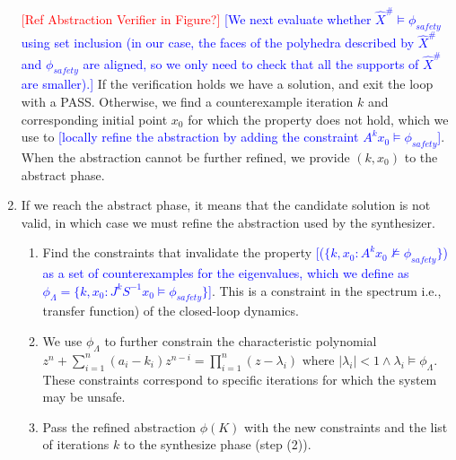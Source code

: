\documentclass[twocolumn]{autart}    %
\newcommand{\mat}[1]{{#1}}
\renewcommand{\vec}[1]{{#1}}
\renewcommand{\note}[1]{\textcolor{red}{[#1]}}
\newcommand{\reply}[1]{\textcolor{blue}{[#1]}}
\begin{document}
\begin{enumerate}
 \note{Ref Abstraction Verifier in Figure?}
\reply{We next evaluate whether $\hat{X}^\# \models \phi_\mathit{safety}$ using set inclusion (in our case, the faces of the polyhedra described by $\hat{X}^\#$ and $\phi_\mathit{safety}$ are aligned, so we only need to check that all the supports of $\hat{X}^\#$ are smaller).}
If the verification holds we have a solution, and exit the loop with a PASS.  Otherwise, we
find a counterexample iteration $k$ and corresponding initial point $x_0$
for which the property does not hold, which we use to \reply{locally refine the
abstraction by adding the constraint $\mat{A}^k\vec{x}_0 \models \phi_\mathit{safety}$}.  When the abstraction cannot be further refined, we provide $(k, x_0)$ to the {\sc abstract} phase.
%
\item If we reach the {\sc abstract} phase, it means that the candidate solution is not valid,
  in which case we must refine the abstraction used by the synthesizer.
\begin{enumerate}
\item Find the constraints that invalidate the property \reply{($\{ k, x_0 : \mat{A}^k\vec{x}_0 \not \models \phi_\mathit{safety}\}$) as a set of counterexamples for the eigenvalues, which we define as $\phi_\Lambda=\{ k, x_0 : \mat{J}^k\mat{S}^{-1}\vec{x}_0 \models \phi_\mathit{safety}\}$}. 
This is a constraint in the spectrum i.e., transfer function) of the closed-loop dynamics.  
\item We use $\phi_\Lambda$ to
  further constrain the characteristic polynomial %
$z^n+\sum_{i=1}^n(a_i-k_i)z^{n-i}=\prod_{i=1}^n (z-\lambda_i) \text{ where } |\lambda_i|<1 \wedge \lambda_i \models \phi_{\Lambda}$. These constraints correspond to specific iterations for which the system may be unsafe.
\item Pass the refined abstraction $\phi(K)$ with the new constraints and the list of iterations $k$ to the {\sc synthesize} phase (step (2)).
\end{enumerate} 
\end{enumerate}
\end{document}
